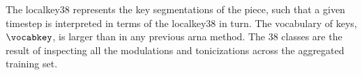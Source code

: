 
The \gls{localkey38} represents the key segmentations of the
piece, such that a given timestep is interpreted in terms of
the \gls{localkey38} in turn. 
The vocabulary of keys, $\vocabkey$, is larger than in any
previous \gls{arna} method. The 38 classes are the result of
inspecting all the modulations and tonicizations across the
aggregated training set.
